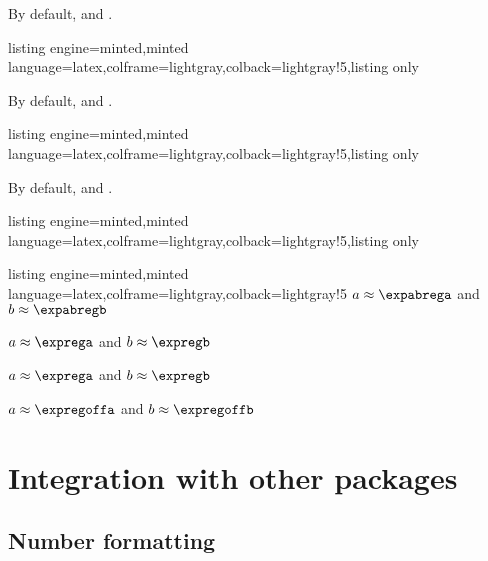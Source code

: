 \documentclass[11pt,a4paper]{ltxdoc}
\begin{document}
By default,  and .

\smallskip

\begin{tcblisting}{listing engine=minted,minted language=latex,colframe=lightgray,colback=lightgray!5,listing only}
\end{tcblisting}

By default,  and .

\smallskip

\begin{tcblisting}{listing engine=minted,minted language=latex,colframe=lightgray,colback=lightgray!5,listing only}
\end{tcblisting}

By default,  and .

\begin{tcblisting}{listing engine=minted,minted language=latex,colframe=lightgray,colback=lightgray!5,listing only}
\def\LLX{83,71,64,69,69,64,68,59,81,91,57,65,58,62}%
\def\LLY{183,168,171,178,176,172,165,158,183,182,163,175,164,175}%
\end{tcblisting}

\begin{tcblisting}{listing engine=minted,minted language=latex,colframe=lightgray,colback=lightgray!5}
\xintexpabreg{\LLX}{\LLY}
$a \approx \expabrega$ and $b \approx \expabregb$

\xintexpreg{\LLX}{\LLY}
$a \approx \exprega$ and $b \approx \expregb$

\xintexpreg[Alt]{\LLX}{\LLY}
$a \approx \exprega$ and $b \approx \expregb$

\xintexpoffreg[offset=50]{\LLX}{\LLY}
$a \approx \expregoffa$ and $b \approx \expregoffb$
\end{tcblisting}

\pagebreak

\section{Integration with other packages}

\subsection{Number formatting}
\end{document}
